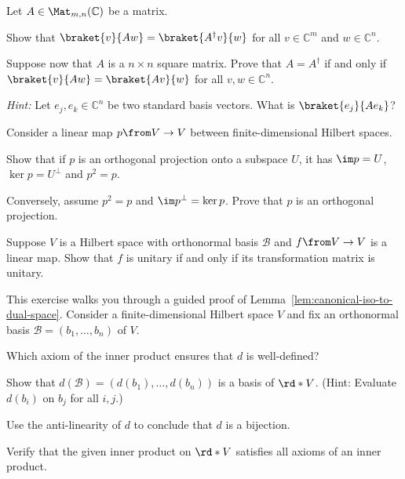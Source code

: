 \documentclass[a4paper,oneside, 12pt]{amsart}
\begin{document}
\begin{exercise}\label{exe:char-of-self-adjoint}
  Let  \(A \in \Mat_{m,n} ( \mathbb{C})\) be a matrix.
  \begin{thmlist}
    \item Show that \(\braket{v}{Aw} = \braket{A^{\dagger} v}{w}\) for all \(v\in \mathbb{C}^{m}\) and \(w \in \mathbb{C}^{n}\).
    \item Suppose now that \(A\) is a \(n\times n\) square matrix.
    Prove that \(A= A^{\dagger}\) if and only if \(\braket{v}{Aw} = \braket{Av}{w}\) for all \( v,w \in \mathbb{C}^{n}\).

    \textit{Hint:} Let \(e_{j}, e_{k}\in \mathbb{C}^{n}\) be two standard basis vectors.
    What is \(\braket{e_{j}}{A e_{k}}\)?
  \end{thmlist}
\end{exercise}

\begin{exercise}\label{exe:alternative-defn-orthogonal-projection}
  Consider a linear map \(p \from V\to V\) between finite-dimensional Hilbert spaces.
  \begin{thmlist}
    \item Show that if \(p\) is an orthogonal projection onto a subspace \(U\), it has \(\im p = U\), \(\ker p = U^{\perp}\) and \(p^{2}= p\).
    \item Conversely, assume \(p^{2}=p\) and \(\im p^{\perp} = \ker p\). Prove that \(p\) is an orthogonal projection.
  \end{thmlist}
\end{exercise}

\begin{exercise}\label{exe:unitary-matrix-unitary-map}
  Suppose \(V\) is a Hilbert space with orthonormal basis \(\mathcal{B}\) and \(f\from V\to V\) is a linear map.
  Show that \(f\) is unitary if and only if its transformation matrix is unitary.
\end{exercise}

\begin{exercise}\label{exe:proof-of-lem-canonical-iso-to-dual-space}
  This exercise walks you through a guided proof of Lemma~\ref{lem:canonical-iso-to-dual-space}.
  Consider a finite-dimensional Hilbert space \( V \) and fix an orthonormal basis \( \mathcal{B} = (b_1, \dots, b_n) \) of \( V \).
  \begin{thmlist}
    \item Which axiom of the inner product ensures that \( d \) is well-defined?
    \item Show that \( d(\mathcal{B}) = ( d(b_1), \dots, d(b_n)) \) is a basis of \( \rd*{V}\).
    (Hint: Evaluate \( d(b_i) \) on \( b_j \) for all \( i, j \).)
    \item Use the anti-linearity of \( d \) to conclude that \( d \) is a bijection.
    \item Verify that the given inner product on \( \rd*{V} \) satisfies all axioms of an inner product.
  \end{thmlist}
\end{exercise}
\end{document}
